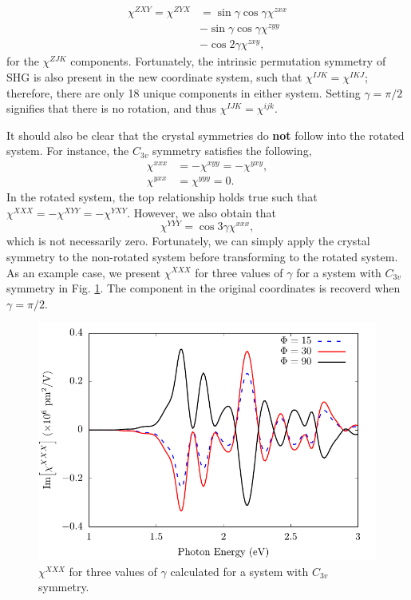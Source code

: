 \documentclass[aps,pra,10pt,amsmath,twocolumn,letterpaper]{revtex4-1}
\begin{document}
\begin{equation*}
\begin{split}
\chi^{ZXY} = \chi^{ZYX}
&= \sin\gamma \cos\gamma \chi^{zxx}\\
&- \sin\gamma \cos\gamma \chi^{zyy}\\
&- \cos2\gamma         \chi^{zxy},
\end{split}
\end{equation*}
for the $\chi^{ZJK}$ components. Fortunately, the intrinsic permutation symmetry
of SHG is also present in the new coordinate system, such that $\chi^{IJK} =
\chi^{IKJ}$; therefore, there are only 18 unique components in either system.
Setting $\gamma = \pi/2$ signifies that there is no rotation, and thus
$\chi^{IJK} = \chi^{ijk}$.

It should also be clear that the crystal symmetries do \textbf{not} follow into
the rotated system. For instance, the $C_{3v}$ symmetry satisfies the following,
\begin{equation*}
\begin{split}
\chi^{xxx} &= -\chi^{xyy} = - \chi^{yxy},\\
\chi^{yxx} &= \chi^{yyy} = 0.
\end{split}
\end{equation*}
In the rotated system, the top relationship holds true such that $\chi^{XXX} =
-\chi^{XYY} = - \chi^{YXY}$. However, we also obtain that
\begin{equation*}
\chi^{YYY} = \cos3\gamma \chi^{xxx},
\end{equation*}
which is not necessarily zero. Fortunately, we can simply apply the crystal
symmetry to the non-rotated system before transforming to the rotated system. As
an example case, we present $\chi^{XXX}$ for three values of $\gamma$ for a
system with $C_{3v}$ symmetry in Fig. \ref{fig:rotxxx}.
The component in the original coordinates is recoverd when $\gamma = \pi/2$.

\begin{figure}[t]
\centering
\includegraphics[width=0.5\linewidth]{fig-xxx}
\caption{$\chi^{XXX}$ for three values of $\gamma$ calculated for a system with
$C_{3v}$ symmetry.}
\label{fig:rotxxx}
\end{figure}
\end{document}
